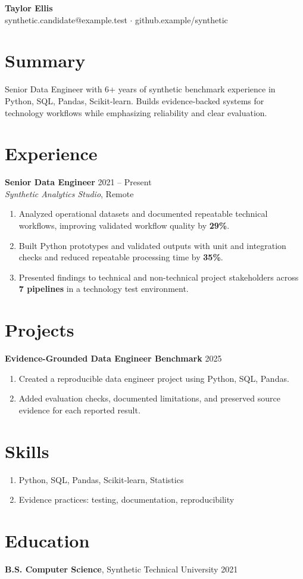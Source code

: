 \documentclass[10pt,letterpaper]{article}
\begin{document}
\begin{center}
{\Large \textbf{Taylor Ellis}}\\
synthetic.candidate@example.test $\cdot$ github.example/synthetic
\end{center}

\section*{Summary}
Senior Data Engineer with 6+ years of synthetic benchmark experience in Python, SQL, Pandas, Scikit-learn. Builds evidence-backed systems for technology workflows while emphasizing reliability and clear evaluation.

\section*{Experience}
\textbf{Senior Data Engineer} \hfill 2021 -- Present\\
\textit{Synthetic Analytics Studio}, Remote
\begin{enumerate}
  \item Analyzed operational datasets and documented repeatable technical workflows, improving validated workflow quality by \textbf{29\%}.
  \item Built Python prototypes and validated outputs with unit and integration checks and reduced repeatable processing time by \textbf{35\%}.
  \item Presented findings to technical and non-technical project stakeholders across \textbf{7 pipelines} in a technology test environment.
\end{enumerate}

\section*{Projects}
\textbf{Evidence-Grounded Data Engineer Benchmark} \hfill 2025
\begin{enumerate}
  \item Created a reproducible data engineer project using Python, SQL, Pandas.
  \item Added evaluation checks, documented limitations, and preserved source evidence for each reported result.
\end{enumerate}

\section*{Skills}
\begin{enumerate}
  \item Python, SQL, Pandas, Scikit-learn, Statistics
  \item Evidence practices: testing, documentation, reproducibility
\end{enumerate}

\section*{Education}
\textbf{B.S. Computer Science}, Synthetic Technical University \hfill 2021
\end{document}
